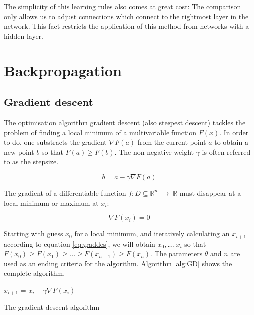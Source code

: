 \documentclass[10pt,a4paper,DIV=11]{scrreprt}
\begin{document}
The simplicity of this learning rules also comes at great cost: The comparison only allows us to adjust connections which connect to the rightmost layer in the network. This fact restricts the application of this method from networks with a hidden layer. 

\section{Backpropagation}

\subsection{Gradient descent}

The optimisation algorithm gradient descent (also steepest descent) tackles the problem of finding a local minimum of a multivariable function $F(x)$. In order to do, one substracts the gradient $\nabla F(a)$ from the current point $a$ to obtain a new point $b$ so that $F(a) \geq F(b)$. The non-negative weight $\gamma$ is often referred to as the stepsize.

\begin{equation}
 b = a - \gamma \nabla F(a)
\label{eq:graddes}
\end{equation} 

The gradient of a differentiable function $f: D \subseteq \mathds{R}^n$ $\rightarrow$ $\mathds{R}$ must disappear at a local minimum or maximum at $x_i$:\cite{MATHINF}

\begin{equation}
\nabla F(x_i) = 0
\end{equation} 

Starting with guess $x_0$ for a local minimum, and iteratively calculating an $x_{i+1}$ according to equation \eqref{eq:graddes}, we will obtain $x_0, ..., x_i$ so that $F(x_0) \geq F(x_1) \geq ... \geq F(x_{n-1}) \geq F(x_n)$. The parameters $\theta$ and $n$ are  used as an ending criteria for the algorithm. Algorithm \ref{alg:GD} shows the complete algorithm.

\begin{algorithm}
\LinesNumbered
\DontPrintSemicolon
\BlankLine
{}
\BlankLine
\Begin
{
    {
        $x_{i+1}$ = $x_i - \gamma \nabla F(x_i)$
    }
}
\caption{The gradient descent algorithm}
\label{alg:GD}
\end{algorithm}
\end{document}
